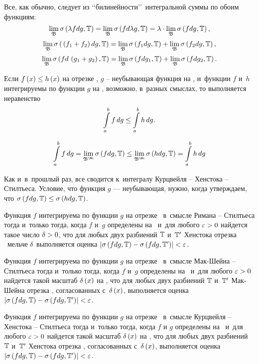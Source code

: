 \documentclass[draft]{article}
\begin{document}
\pr

Все, как обычно, следует из \lq\lq билинейности\rq\rq\ интегральной
суммы по обоим функциям:
$$\lim_\base\isum(\lambda fdg,\T)=\lim_\base\isum(fd\lambda
g,\T)=\lambda\cdot\lim_\base\isfdgT,$$
$$\lim_\base\isum(\,\at(f_1+f_2)dg,\T)=\lim_\base\isum(f_1dg,\T)+
\lim_\base\isum(f_2dg,\T),$$
$$\lim_\base\isum(fd\,\at(g_1+g_2),\T)=\lim_\base\isum(fdg_1,\T)+
\lim_\base\isum(fdg_2,\T).$$

\prut

\bigskip


Если $f\atx\le h\atx$ на отрезке \ab, $g$ -- неубывающая функция на
\ab, и~функции $f$ и~$h$ интегрируемы по функции $g$ на \ab,
возможно, в~разных смыслах, то выполняется неравенство $$\intab
f,g\le\intab h,g.$$

\pr

$$
\intab f,g =
\lim_{\basekurzh}\isum(fdg,\T)\le\lim_{\basekurzh}\isum(hdg,\T)=\intab
h,g$$

Как и~в~прошлый раз, все сводится к~интегралу Курцвейля -- Хенстока
-- Стилтьеса. Условие, что функция $g$ --- неубывающая, нужно, когда
утверждаем, что $\isum(fdg,\T)\le\isum(hdg,\T)$.

\prut

\eject


\smallskip

Функция $f$ интегрируема по функции $g$ на отрезке \ab\ в~смысле
Римана -- Стилтьеса тогда и~только тогда, когда $f$ и~$g$ определены
на \ab\ и~для любого $\varepsilon > 0$ найдется такое число $\delta > 0$, что для
любых двух разбиений $\mathbb{T}$ и~$\mathbb{T}'$ Хенстока отрезка \ab\ мельче $\delta$
выполняется оценка $\abs{\isum(fdg,\T)-\isum(fdg,\T')}<\ep$.

\smallskip

Функция $f$ интегрируема по функции $g$  на отрезке \ab\ в~смысле
Мак-Шейна -- Стилтьеса тогда и~только тогда, когда $f$ и~$g$
определены на \ab\ и~для любого $\varepsilon > 0$ найдется такой масштаб
$\dex$ на \ab, что для любых двух разбиений $\mathbb{T}$ и~$\mathbb{T}'$ Мак-Шейна
отрезка \ab, согласованных с~$\dex$, выполняется оценка
$\abs{\isum(fdg,\T)-\isum(fdg,\T')}<\ep$.

\smallskip

Функция $f$ интегрируема по функции $g$  на отрезке \ab\ в~смысле
Курцвейля -- Хенстока -- Стилтьеса тогда и~только тогда, когда $f$ и
$g$ определены на \ab\ и~для любого $\varepsilon > 0$ найдется такой масштаб
$\dex$ на \ab, что для любых двух разбиений $\mathbb{T}$ и~$\mathbb{T}'$ Хенстока
отрезка \ab, согласованных с~$\dex$, выполняется оценка
$\abs{\isum(fdg,\T)-\isum(fdg,\T')}<\ep$.
\end{document}
